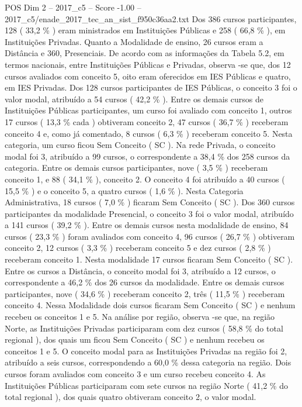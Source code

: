 \begin{textsample}{POS Dim 2 – 2017\_c5 – Score -1.00 – 2017\_c5/enade\_2017\_tec\_an\_sist\_f950c36aa2.txt}
Dos 386 cursos participantes, 128 ( 33,2 \% ) eram ministrados em Instituições Públicas e 258 ( 66,8 \% ), em Instituições Privadas.
Quanto a Modalidade de ensino, 26 cursos eram a Distância e 360, Presenciais.
De acordo com as informações da Tabela 5.2, em termos nacionais, entre Instituições Públicas e Privadas, observa -se que, dos 12 cursos avaliados com conceito 5, oito eram oferecidos em IES Públicas e quatro, em IES Privadas.
Dos 128 cursos participantes de IES Públicas, o conceito 3 foi o valor modal, atribuído a 54 cursos ( 42,2 \% ).
Entre os demais cursos de Instituições Públicas participantes, um curso foi avaliado com conceito 1, outros 17 cursos ( 13,3 \% cada ) obtiveram conceito 2, 47 cursos ( 36,7 \% ) receberam conceito 4 e, como já comentado, 8 cursos ( 6,3 \% ) receberam conceito 5.
Nesta categoria, um curso ficou Sem Conceito ( SC ).
Na rede Privada, o conceito modal foi 3, atribuído a 99 cursos, o correspondente a 38,4 \% dos 258 cursos da categoria.
Entre os demais cursos participantes, nove ( 3,5 \% ) receberam conceito 1, e 88 ( 34,1 \% ), conceito 2.
O conceito 4 foi atribuído a 40 cursos ( 15,5 \% ) e o conceito 5, a quatro cursos ( 1,6 \% ).
Nesta Categoria Administrativa, 18 cursos ( 7,0 \% ) ficaram Sem Conceito ( SC ).
Dos 360 cursos participantes da modalidade Presencial, o conceito 3 foi o valor modal, atribuído a 141 cursos ( 39,2 \% ).
Entre os demais cursos nesta modalidade de ensino, 84 cursos ( 23,3 \% ) foram avaliados com conceito 4, 96 cursos ( 26,7 \% ) obtiveram conceito 2, 12 cursos ( 3,3 \% ) receberam conceito 5 e dez cursos ( 2,8 \% ) receberam conceito 1.
Nesta modalidade 17 cursos ficaram Sem Conceito ( SC ).
Entre os cursos a Distância, o conceito modal foi 3, atribuído a 12 cursos, o correspondente a 46,2 \% dos 26 cursos da modalidade.
Entre os demais cursos participantes, nove ( 34,6 \% ) receberam conceito 2, três ( 11,5 \% ) receberam conceito 4.
Nessa Modalidade dois cursos ficaram Sem Conceito ( SC ) e nenhum recebeu os conceitos 1 e 5.
Na análise por região, observa -se que, na região Norte, as Instituições Privadas participaram com dez cursos ( 58,8 \% do total regional ), dos quais um ficou Sem Conceito ( SC ) e nenhum recebeu os conceitos 1 e 5.
O conceito modal para as Instituições Privadas na região foi 2, atribuído a seis cursos, correspondendo a 60,0 \% dessa categoria na região.
Dois cursos foram avaliados com conceito 3 e um curso recebeu conceito 4.
As Instituições Públicas participaram com sete cursos na região Norte ( 41,2 \% do total regional ), dos quais quatro obtiveram conceito 2, o valor modal.

\end{textsample}
